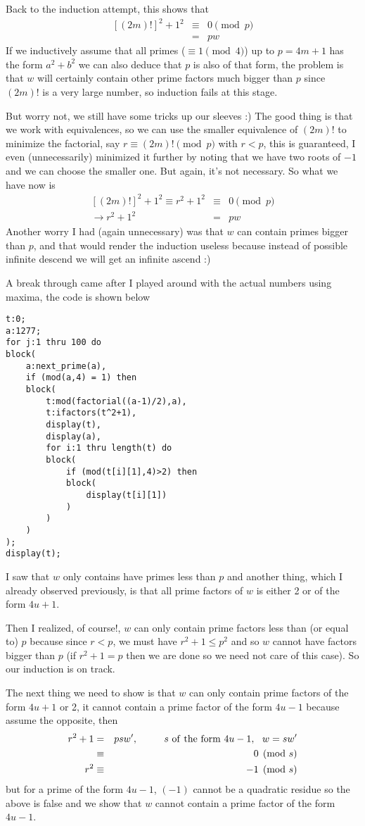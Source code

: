 \documentclass[aps,preprint,preprintnumbers,nofootinbib,showpacs,prd]{revtex4-1}
\newcommand{\nbea}{\begin{eqnarray*}}
\newcommand{\neea}{\end{eqnarray*}}
\begin{document}
Back to the induction attempt, this shows that
%
\nbea
\left \lbrack\left ( 2m \right ) ! \right \rbrack^2 + 1^2 & \equiv & 0 \pmod{p} \\
& = & pw
\neea
%
If we inductively assume that all primes ($\equiv 1 \pmod{4}$) up to $p = 4m+1$ has the form $a^2 + b^2$ we can also deduce that $p$ is also of that form, the problem is that $w$ will certainly contain other prime factors much bigger than $p$ since $(2m)!$ is a very large number, so induction fails at this stage.

But worry not, we still have some tricks up our sleeves :) The good thing is that we work with equivalences, so we can use the smaller equivalence of $(2m)!$ to minimize the factorial, say $r \equiv (2m)! \pmod{p}$ with $r < p$, this is guaranteed, I even (unnecessarily) minimized it further by noting that we have two roots of $-1$ and we can choose the smaller one. But again, it's not necessary. So what we have now is
%
\nbea
\left \lbrack\left ( 2m \right ) ! \right \rbrack^2 + 1^2 \equiv r^2 + 1^2 & \equiv & 0 \pmod{p} \\
\to r^2 + 1^2 & = & pw
\neea
%
Another worry I had (again unnecessary) was that $w$ can contain primes bigger than $p$, and that would render the induction useless because instead of possible infinite descend we will get an infinite ascend :)

A break through came after I played around with the actual numbers using maxima, the code is shown below
%
\begin{verbatim}
t:0;
a:1277;
for j:1 thru 100 do
block(
    a:next_prime(a),
    if (mod(a,4) = 1) then 
    block(
        t:mod(factorial((a-1)/2),a),
        t:ifactors(t^2+1),
        display(t),
        display(a),
        for i:1 thru length(t) do
        block(
            if (mod(t[i][1],4)>2) then
            block(
                display(t[i][1])
            ) 
        )
    )  
);
display(t);
\end{verbatim}
%
I saw that $w$ only contains have primes less than $p$ and another thing, which I already observed previously, is that all prime factors of $w$ is either 2 or of the form $4u+1$.

Then I realized, of course!, $w$ can only contain prime factors less than (or equal to) $p$ because since $r < p$, we must have $r^2 + 1 \le p^2$ and so $w$ cannot have factors bigger than $p$ (if $r^2 + 1 = p$ then we are done so we need not care of this case). So our induction is on track.

The next thing we need to show is that $w$ can only contain prime factors of the form $4u+1$ or 2, it cannot contain a prime factor of the form $4u-1$ because assume the opposite, then
%
\nbea
r^2 + 1 & = & p s w', ~~~~~~~~ s{\rm~of~the~form~} 4u-1, ~~w = sw' \\
& \equiv & 0 \pmod{s} \\
r^2 & \equiv & - 1 \pmod{s}
\neea
%
but for a prime of the form $4u-1$, $(-1)$ cannot be a quadratic residue so the above is false and we show that $w$ cannot contain a prime factor of the form $4u-1$.
\end{document}
